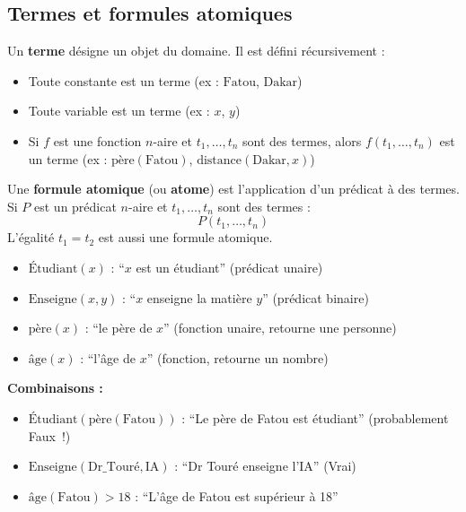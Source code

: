 \documentclass[11pt,a4paper]{article}
\begin{document}
\subsection{Termes et formules atomiques}

\begin{definitionbox}
Un \textbf{terme} désigne un objet du domaine. Il est défini récursivement :
\begin{itemize}[nosep]
    \item Toute constante est un terme (ex : $\text{Fatou}$, $\text{Dakar}$)
    \item Toute variable est un terme (ex : $x$, $y$)
    \item Si $f$ est une fonction $n$-aire et $t_1, \ldots, t_n$ sont des termes, alors $f(t_1, \ldots, t_n)$ est un terme (ex : $\text{père}(\text{Fatou})$, $\text{distance}(\text{Dakar}, x)$)
\end{itemize}
\end{definitionbox}

\begin{definitionbox}
Une \textbf{formule atomique} (ou \textbf{atome}) est l'application d'un prédicat à des termes. Si $P$ est un prédicat $n$-aire et $t_1, \ldots, t_n$ sont des termes :
$$P(t_1, \ldots, t_n)$$
L'égalité $t_1 = t_2$ est aussi une formule atomique.
\end{definitionbox}

\begin{exemplebox}
\begin{itemize}[nosep]
    \item $\text{Étudiant}(x)$ : ``$x$ est un étudiant'' (prédicat unaire)
    \item $\text{Enseigne}(x, y)$ : ``$x$ enseigne la matière $y$'' (prédicat binaire)
    \item $\text{père}(x)$ : ``le père de $x$'' (fonction unaire, retourne une personne)
    \item $\text{âge}(x)$ : ``l'âge de $x$'' (fonction, retourne un nombre)
\end{itemize}

\textbf{Combinaisons :}
\begin{itemize}[nosep]
    \item $\text{Étudiant}(\text{père}(\text{Fatou}))$ : ``Le père de Fatou est étudiant'' (probablement Faux~!)
    \item $\text{Enseigne}(\text{Dr\_Touré}, \text{IA})$ : ``Dr Touré enseigne l'IA'' (Vrai)
    \item $\text{âge}(\text{Fatou}) > 18$ : ``L'âge de Fatou est supérieur à 18''
\end{itemize}
\end{exemplebox}
\end{document}

